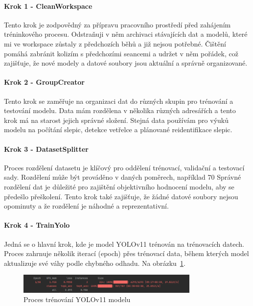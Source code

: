 \paragraph*{Krok 1 - CleanWorkspace}

Tento krok je zodpovědný za přípravu pracovního prostředí před zahájením tréninkového procesu.
Odstraňuji v něm archivaci stávajících dat a modelů, které mi ve workspace zůstaly z předchozích běhů a již nejsou potřebné.
Čištění pomáhá zabránit kolizím s předchozími seancemi a udržet v něm pořádek, což zajišťuje, že nové modely a datové soubory jsou aktuální a správně organizované.

\paragraph*{Krok 2 - GroupCreator}

Tento krok se zaměřuje na organizaci dat do různých skupin pro trénování a testování modelu.
Data mám rozdělena v několika různých adresářích a tento krok má na starost jejich správné složení.
Stejná data používám pro výuků modelu na počítání slepic, detekce vetřelce a plánované reidentifikace slepic.

\paragraph*{Krok 3 - DatasetSplitter}

Proces rozdělení datasetu je klíčový pro oddělení trénovací, validační a testovací sady.
Rozdělení může být prováděno v daných poměrech, například 70%
Správné rozdělení dat je důležité pro zajištění objektivního hodnocení modelu, aby se předešlo přeškolení.
Tento krok také zajišťuje, že žádné datové soubory nejsou opominuty a že rozdělení je náhodné a reprezentativní.

\paragraph*{Krok 4 - TrainYolo}

Jedná se o hlavní krok, kde je model YOLOv11 trénován na trénovacích datech.
Proces zahrnuje několik iterací (epoch) přes trénovací data, během kterých model aktualizuje své váhy podle chybného odhadu.
Na obrázku~\ref{fig:train_yolo}.


\begin{figure}[htbp]
    \centering
    \includegraphics[width=0.8\textwidth]{img/train_yolo}
    \caption{Proces trénování YOLOv11 modelu}
    \label{fig:train_yolo}
\end{figure}

